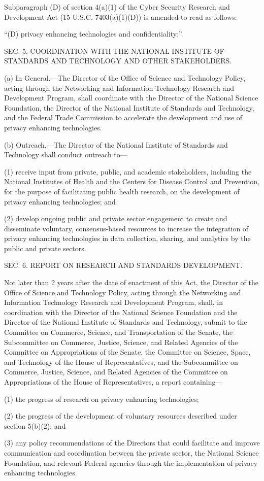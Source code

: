 Subparagraph (D) of section 4(a)(1) of the Cyber Security Research and Development Act (15 U.S.C. 7403(a)(1)(D)) is amended to read as follows:


“(D) privacy enhancing technologies and confidentiality;”.

SEC. 5. COORDINATION WITH THE NATIONAL INSTITUTE OF STANDARDS AND TECHNOLOGY AND OTHER STAKEHOLDERS.

(a) In General.—The Director of the Office of Science and Technology Policy, acting through the Networking and Information Technology Research and Development Program, shall coordinate with the Director of the National Science Foundation, the Director of the National Institute of Standards and Technology, and the Federal Trade Commission to accelerate the development and use of privacy enhancing technologies.

(b) Outreach.—The Director of the National Institute of Standards and Technology shall conduct outreach to—

(1) receive input from private, public, and academic stakeholders, including the National Institutes of Health and the Centers for Disease Control and Prevention, for the purpose of facilitating public health research, on the development of privacy enhancing technologies; and

(2) develop ongoing public and private sector engagement to create and disseminate voluntary, consensus-based resources to increase the integration of privacy enhancing technologies in data collection, sharing, and analytics by the public and private sectors.

SEC. 6. REPORT ON RESEARCH AND STANDARDS DEVELOPMENT.

Not later than 2 years after the date of enactment of this Act, the Director of the Office of Science and Technology Policy, acting through the Networking and Information Technology Research and Development Program, shall, in coordination with the Director of the National Science Foundation and the Director of the National Institute of Standards and Technology, submit to the Committee on Commerce, Science, and Transportation of the Senate, the Subcommittee on Commerce, Justice, Science, and Related Agencies of the Committee on Appropriations of the Senate, the Committee on Science, Space, and Technology of the House of Representatives, and the Subcommittee on Commerce, Justice, Science, and Related Agencies of the Committee on Appropriations of the House of Representatives, a report containing—

(1) the progress of research on privacy enhancing technologies;

(2) the progress of the development of voluntary resources described under section 5(b)(2); and

(3) any policy recommendations of the Directors that could facilitate and improve communication and coordination between the private sector, the National Science Foundation, and relevant Federal agencies through the implementation of privacy enhancing technologies.


